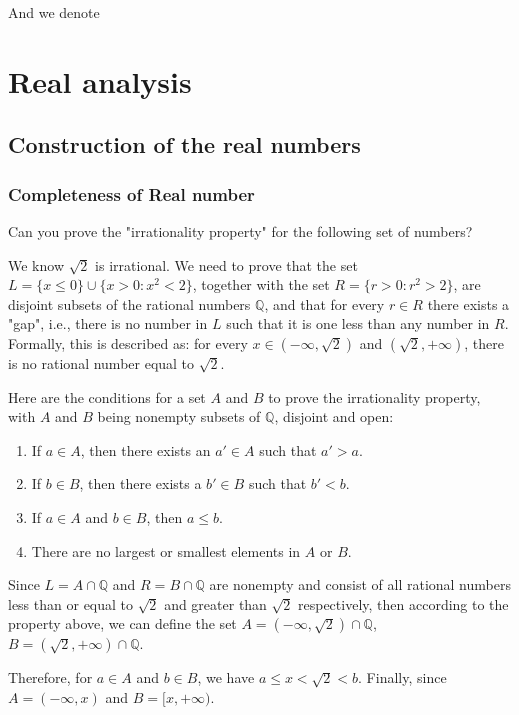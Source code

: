\documentclass{article}
\begin{document}
And we denote 






\section{Real analysis}
\subsection{Construction of the real numbers}
\subsubsection{Completeness of Real number}

Can you prove the "irrationality property" for the following set of numbers?

We know $\sqrt{2}$ is irrational. We need to prove that the set 
$L = \{ x \leq 0 \} \cup \{ x > 0 : x^2 < 2 \}$, 
together with the set $R = \{ r > 0 : r^2 > 2 \}$, 
are disjoint subsets of the rational numbers $\mathbb{Q}$, 
and that for every $r \in R$ there exists a "gap", 
i.e., there is no number in $L$ such that it is one less than any number in $R$. 
Formally, this is described as: for every $x \in (-\infty, \sqrt{2})$ 
and $(\sqrt{2}, +\infty)$, there is no rational number equal to $\sqrt{2}$.

Here are the conditions for a set $A$ and $B$ to prove the irrationality property, 
with $A$ and $B$ being nonempty subsets of $\mathbb{Q}$, disjoint and open:

\begin{enumerate}
  \item If $a \in A$, then there exists an $a' \in A$ such that $a' > a$.
  \item If $b \in B$, then there exists a $b' \in B$ such that $b' < b$.
  \item If $a \in A$ and $b \in B$, then $a \leq b$.
  \item There are no largest or smallest elements in $A$ or $B$.
\end{enumerate}

Since $L = A \cap \mathbb{Q}$ and $R = B \cap \mathbb{Q}$ are nonempty and consist of all rational numbers less than or equal to $\sqrt{2}$ and greater than $\sqrt{2}$ respectively, then according to the property above, we can define the set $A = (-\infty, \sqrt{2}) \cap \mathbb{Q}$, $B = (\sqrt{2}, +\infty) \cap \mathbb{Q}$.

Therefore, for $a \in A$ and $b \in B$, we have $a \leq x < \sqrt{2} < b$. Finally, since $A = (-\infty, x)$ and $B = [x, +\infty)$.
\end{document}

